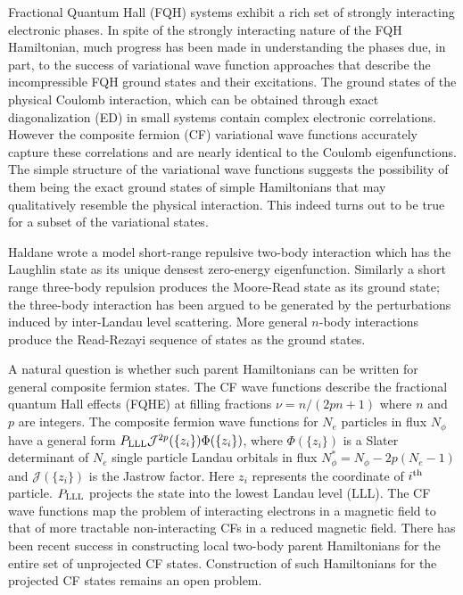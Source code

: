 \documentclass[prb,aps,epsfig,longbibliography,twocolumn]{revtex4-1}
\newcommand{\np}{N_{\phi}}
\begin{document}
Fractional Quantum Hall (FQH) systems exhibit a rich set of strongly interacting electronic phases.\cite{Klitzing80,Tsui82}
%
In spite of the strongly interacting nature of the FQH Hamiltonian, much progress has been made in understanding the phases due, in part, to the success of variational wave function approaches that describe the incompressible FQH ground states and their excitations. \cite{Laughlin83, Jain89, Jain89parton, Scarola2001, MOORE1991, RR99}
%
The ground states of the physical Coulomb interaction, which can be obtained through exact diagonalization (ED) in small systems contain complex electronic correlations. However the composite fermion (CF) variational wave functions accurately capture these correlations and are nearly identical to the Coulomb eigenfunctions. \cite{Jain89} The simple structure of the variational wave functions suggests the possibility of them being the exact ground states of simple Hamiltonians that may qualitatively resemble the physical interaction. This indeed turns out to be true for a subset of the variational states.

Haldane wrote a model short-range repulsive two-body interaction which has the Laughlin state as its unique densest zero-energy eigenfunction.\cite{Haldane83} Similarly a short range three-body repulsion produces the Moore-Read state as its ground state;\cite{MOORE1991} the three-body interaction has been argued to be generated by the perturbations induced by inter-Landau level scattering.\cite{Wojs10,Bishara09,Peterson13,Simon13,Sodemann13,Pakrouski15}
More general $n$-body interactions produce the Read-Rezayi sequence of states as the ground states.\cite{RR99,Simon07a}
%

A natural question is whether such parent Hamiltonians can be written for general composite fermion states. The CF wave functions describe the fractional quantum Hall effects (FQHE) at filling fractions $\nu=n/(2pn+1)$ where $n$ and $p$ are integers. 
%
The composite fermion wave functions for $N_e$ particles in flux $N_\phi$ have a general form $P_{\rm LLL}\mathcal{J}^{2p}(\{z_i\})\Phi(\{z_i\})$, where $\Phi(\{z_i\})$ is a Slater determinant of $N_e$ single particle Landau orbitals in flux $\np^*=N_\phi-2p(N_e-1)$ and $\mathcal{J}(\{z_i\})$ is the Jastrow factor. Here $z_i$ represents the coordinate of $i^{\rm th}$ particle. $P_{\rm LLL}$ projects the state into the lowest Landau level (LLL). The CF wave functions map the problem of interacting electrons in a magnetic field to that of more tractable non-interacting CFs in a reduced magnetic field. 
%
There has been recent success in constructing local two-body parent Hamiltonians for the entire set of unprojected CF states.\cite{Chen2017,Greiter2018,Bandyopadhyay18,Bandyopadhyay20,BoYang22}
Construction of such Hamiltonians for the projected CF states remains an open problem.\cite{Sreejith2018}
\end{document}
